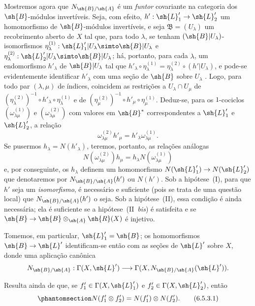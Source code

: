 \documentclass[oneside,10pt]{amsart}
\makeatletter
\newcommand{\ega@arrow}[2]{\mathchoice{#1}{#2}{#2}{#2}}
\renewcommand{\to}{\ega@arrow{\longrightarrow}{\rightarrow}}
\newcommand{\oldpage}[2][]{\marginnote{\normalfont\footnotesize\textbf{#1}~|~#2}\ignorespaces}
\let\EGAOriginalLabel\label
\renewcommand{\label}[1]{\phantomsection\EGAOriginalLabel{#1}}
\makeatother
\begin{document}
\begin{env}[6.5.3]
\label{II.6.5.3}
Mostremos agora que $N_{\sh{B}/\sh{A}}$ é um \emph{funtor} covariante na categoria dos $\sh{B}$-módulos invertíveis.
Seja, com efeito, $h':\sh{L}'_1\to\sh{L}'_2$ um homomorfismo de $\sh{B}$-módulos invertíveis, e seja $\mathfrak{B}=(U_\lambda)$ um recobrimento aberto de $X$ tal que, para todo $\lambda$, se tenham $(\sh{B}|U_\lambda)$-isomorfismos $\eta_\lambda^{(1)}:\sh{L}'_1|U_\lambda\simto\sh{B}|U_\lambda$ e $\eta_\lambda^{(2)}:\sh{L}'_2|U_\lambda\simto\sh{B}|U_\lambda$;
há, portanto, para cada $\lambda$, um endomorfismo $h'_\lambda$ de $\sh{B}|U_\lambda$ tal que $h'_\lambda\circ\eta_\lambda^{(1)}=\eta_\lambda^{(2)}\circ(h'|U_\lambda)$, e pode-se evidentemente identificar $h'_\lambda$ com uma seção de $\sh{B}$ sobre $U_\lambda$ .
Logo, para todo par $(\lambda,\mu)$ de índices, coincidem as restrições a $U_\lambda\cap U_\mu$ de $(\eta_\lambda^{(2)})^{-1}\circ h'_\lambda\circ\eta_\lambda^{(1)}$ e de $(\eta_\mu^{(2)})^{-1}\circ h'_\mu\circ\eta_\mu^{(1)}$.
Deduz-se, para os $1$-cociclos $(\omega_{\lambda\mu}^{(1)})$ e $(\omega_{\lambda\mu}^{(2)})$ com valores em $\sh{B}^*$ correspondentes a $\sh{L}'_1$ e $\sh{L}'_2$, a relação
\[
  \omega_{\lambda\mu}^{(2)}h'_\mu = h'_\lambda\omega_{\lambda\mu}^{(1)}.
\]
\oldpage[II]{128}
Se pusermos $h_\lambda=N(h'_\lambda)$, teremos, portanto, as relações análogas
\[
  N(\omega_{\lambda\mu}^{(2)})h_\mu = h_\lambda N(\omega_{\lambda\mu}^{(1)})
\]
e, por conseguinte, os $h_\lambda$ definem um homomorfismo $N(\sh{L}'_1)\to N(\sh{L}'_2)$ que denotaremos por $N_{\sh{B}/\sh{A}}(h')$ ou $N(h')$.
Sob a hipótese~(I), para que $h'$ seja um \emph{isomorfismo}, é necessário e suficiente (pois se trata de uma questão local) que $N_{\sh{B}/\sh{A}}(h')$ o seja.
Sob a hipótese~(II), essa condição é ainda necessária;
ela é suficiente se a hipótese~(II~\emph{bis}) é satisfeita e se $\sh{B}\to\sh{B}\otimes_{\sh{A}}\sh{R}(X)$ é injetivo.

Tomemos, em particular, $\sh{L}'_1=\sh{B}$;
os homomorfismos $\sh{B}\to\sh{L}'$ identificam-se então  com as seções de $\sh{L}'$ sobre $X$, donde uma aplicação canônica
\[
  N_{\sh{B}/\sh{A}} : \Gamma(X,\sh{L}')\to\Gamma(X,N_{\sh{B}/\sh{A}}(\sh{L}')).
\]

Resulta ainda de  que, se $f'_1\in\Gamma(X,\sh{L}'_1)$ e $f'_2\in\Gamma(X,\sh{L}'_2)$, então
\[
\label{II.6.5.3.1}
  N(f'_1\otimes f'_2) = N(f'_1)\otimes N(f'_2).
\tag{6.5.3.1}
\]


\end{env}
\end{document}

